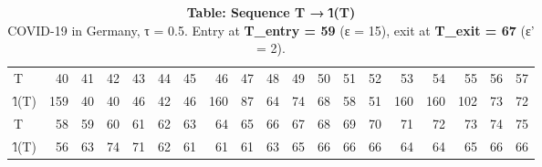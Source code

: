 \begin{table}[t]
\caption*{
{\large \textbf{Table: Sequence T → l̂(T)}} \\ 
{\small COVID-19 in Germany, τ = 0.5. Entry at \textbf{T\_entry = 59} (ε = 15), exit at \textbf{T\_exit = 67} (ε' = 2).}
} 
\begin{tabular*}{\linewidth}{@{\extracolsep{\fill}}lrrrrrrrrrrrrrrrrrr}
\toprule
 &  &  &  &  &  &  &  &  &  &  &  &  &  &  &  &  &  &  \\ 
\midrule\addlinespace[2.5pt]
T & 40 & 41 & 42 & 43 & 44 & 45 & 46 & 47 & 48 & 49 & 50 & 51 & 52 & 53 & 54 & 55 & 56 & 57 \\ 
l̂(T) & 159 & 40 & 40 & 46 & 42 & 46 & 160 & 87 & 64 & 74 & 68 & 58 & 51 & 160 & 160 & 102 & 73 & 72 \\ 
T & 58 & 59 & 60 & 61 & 62 & 63 & 64 & 65 & 66 & 67 & 68 & 69 & 70 & 71 & 72 & 73 & 74 & 75 \\ 
l̂(T) & 56 & 63 & 74 & 71 & 62 & 61 & 61 & 61 & 63 & 65 & 66 & 66 & 66 & 64 & 64 & 65 & 66 & 66 \\ 
\bottomrule
\end{tabular*}
\end{table}
